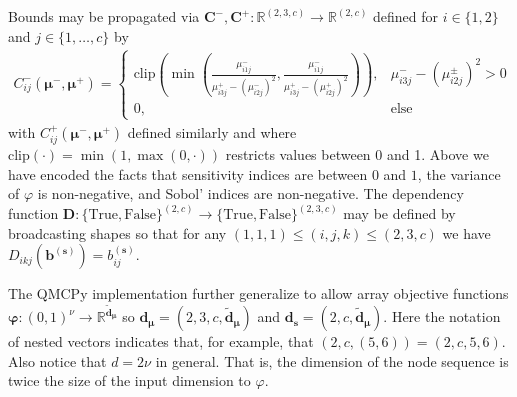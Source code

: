 \documentclass[graybox]{svmult}
\begin{document}
Bounds may be propagated via $\boldsymbol{C}^-,\boldsymbol{C}^+:\mathbb{R}^{(2, 3, c)} \to \mathbb{R}^{(2, c)}$ defined for $i \in \{1,2\}$ and $j \in \{1,\dots,c\}$  by  
\begin{align*}
    C_{ij}^-(\boldsymbol{\mu}^-,\boldsymbol{\mu}^+) 
    = \begin{cases} 
        \text{clip}\left(\min\left(\frac{\mu_{i1j}^-}{\mu_{i3j}^+-\left(\mu_{i2j}^-\right)^2},\frac{\mu_{i1j}^-}{\mu_{i3j}^+-\left(\mu_{i2j}^+\right)^2}\right)\right), & \mu_{i3j}^- - \left(\mu_{i2j}^\pm\right)^2 >0 \\
        0, &\text{else}
     \end{cases} %
\end{align*}
with $C^+_{ij}(\boldsymbol{\mu}^-,\boldsymbol{\mu}^+)$ defined similarly and where $\text{clip}(\cdot) = \min(1,\max(0,\cdot))$ restricts values between 0 and 1. Above we have encoded the facts that sensitivity indices are between $0$ and $1$, the variance of $\varphi$ is non-negative, and Sobol' indices are non-negative. The dependency function $\boldsymbol{D}:\{\text{True},\text{False}\}^{(2, c)} \to \{\text{True},\text{False}\}^{(2, 3, c)}$ may be defined by broadcasting shapes so that for any $(1,1,1) \leq (i,j,k) \leq (2,3,c)$ we have $D_{ikj}(\boldsymbol{b}^{(\boldsymbol{s})}) = b_{ij}^{(\boldsymbol{s})}$. 

The QMCPy implementation further generalize to allow array objective functions $\boldsymbol{\varphi}: (0,1)^\nu \to \mathbb{R}^{\tilde{\boldsymbol{d}}_{\boldsymbol{\mu}}}$ so $\boldsymbol{d}_{\boldsymbol{\mu}} = (2,3,c,\tilde{\boldsymbol{d}}_{\boldsymbol{\mu}})$ and $\boldsymbol{d}_{\boldsymbol{s}} = (2,c,\tilde{\boldsymbol{d}}_{\boldsymbol{\mu}})$. Here the notation of nested vectors indicates that, for example, that  $(2,c,(5,6)) =(2,c,5,6)$. Also notice that $d = 2 \nu$ in general. That is, the dimension of the node sequence is twice the size of the input dimension to $\varphi$.
\end{document}
